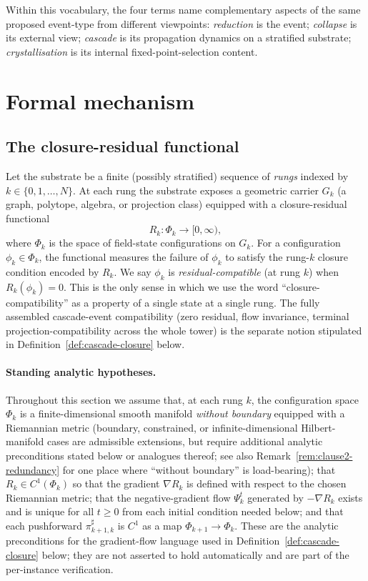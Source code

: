 \documentclass[11pt]{article}
\theoremstyle{definition}
\begin{document}
Within this vocabulary, the four terms name complementary aspects of the same proposed event-type from different
viewpoints: \emph{reduction} is the event; \emph{collapse} is its
external view; \emph{cascade} is its propagation dynamics on a
stratified substrate; \emph{crystallisation} is its internal
fixed-point-selection content.

\section{Formal mechanism}\label{sec:mechanism}

\subsection{The closure-residual functional}\label{ssec:closure-residual}

Let the substrate be a finite (possibly stratified) sequence of
\emph{rungs} indexed by $k \in \{0, 1, \ldots, N\}$. At each rung the
substrate exposes a geometric carrier $G_k$ (a graph, polytope,
algebra, or projection class) equipped with a closure-residual
functional
\begin{equation}\label{eq:Rk}
   R_k : \Phi_k \longrightarrow [0, \infty),
\end{equation}
where $\Phi_k$ is the space of field-state configurations on $G_k$. For a configuration $\phi_k \in \Phi_k$, the functional
measures the failure of $\phi_k$ to satisfy the rung-$k$ closure
condition encoded by $R_k$. We say $\phi_k$ is
\emph{residual-compatible} (at rung $k$) when $R_k(\phi_k) = 0$.
This is the only sense in which we use the word
``closure-compatibility'' as a property of a single state at a single
rung. The fully assembled cascade-event compatibility (zero residual,
flow invariance, terminal projection-compatibility across the whole
tower) is the separate notion stipulated in
Definition~\ref{def:cascade-closure} below.

\paragraph*{Standing analytic hypotheses.} Throughout this section we
assume that, at each rung $k$, the configuration space $\Phi_k$ is a
finite-dimensional smooth manifold \emph{without boundary} equipped
with a Riemannian metric (boundary, constrained, or
infinite-dimensional Hilbert-manifold cases are admissible
extensions, but require additional analytic preconditions stated below
or analogues thereof; see also Remark~\ref{rem:clause2-redundancy}
for one place where ``without boundary'' is load-bearing); that
$R_k \in C^1(\Phi_k)$ so that the gradient $\nabla R_k$ is defined
with respect to the chosen Riemannian metric; that the
negative-gradient flow $\Psi_k^t$ generated by $-\nabla R_k$ exists
and is unique for all $t \geq 0$ from each initial condition needed
below; and that each pushforward $\pi^{\sharp}_{k+1, k}$ is
$C^1$ as a map $\Phi_{k+1} \to \Phi_k$. These are the analytic
preconditions for the gradient-flow language used in
Definition~\ref{def:cascade-closure} below; they are not asserted to
hold automatically and are part of the per-instance verification.
\end{document}
